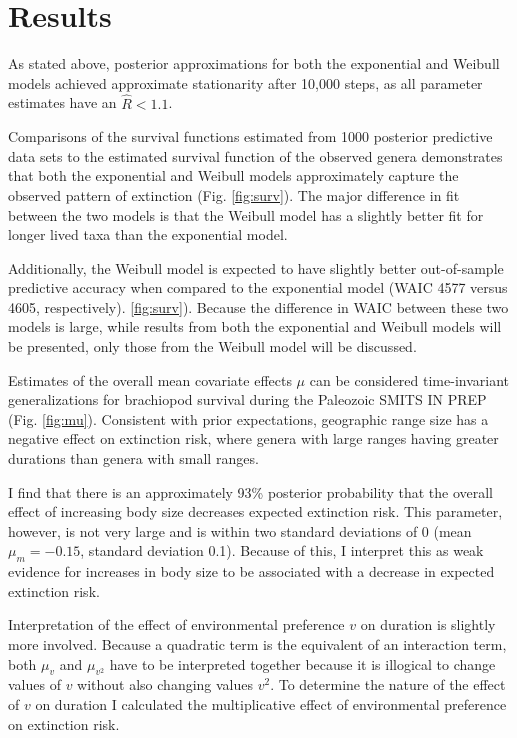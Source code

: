 \documentclass[12pt,letterpaper]{article}
\begin{document}
\section{Results}

As stated above, posterior approximations for both the exponential and Weibull models achieved approximate stationarity after 10,000 steps, as all parameter estimates have an \(\hat{R} < 1.1\).%

Comparisons of the survival functions estimated from 1000 posterior predictive data sets to the estimated survival function of the observed genera demonstrates that both the exponential and Weibull models approximately capture the observed pattern of extinction (Fig. \ref{fig:surv}). The major difference in fit between the two models is that the Weibull model has a slightly better fit for longer lived taxa than the exponential model.


Additionally, the Weibull model is expected to have slightly better out-of-sample predictive accuracy when compared to the exponential model (WAIC 4577 versus 4605, respectively). \ref{fig:surv}). Because the difference in WAIC between these two models is large, while results from both the exponential and Weibull models will be presented, only those from the Weibull model will be discussed.

Estimates of the overall mean covariate effects \(\mu\) can be considered time-invariant generalizations for brachiopod survival during the Paleozoic \uppercase{Smits in prep} (Fig. \ref{fig:mu}). Consistent with prior expectations, geographic range size has a negative effect on extinction risk, where genera with large ranges having greater durations than genera with small ranges. 

I find that there is an approximately 93\% posterior probability that the overall effect of increasing body size decreases expected extinction risk. This parameter, however, is not very large and is within two standard deviations of 0 (mean \(\mu_{m} = -0.15\), standard deviation 0.1). Because of this, I interpret this as weak evidence for increases in body size to be associated with a decrease in expected extinction risk.

Interpretation of the effect of environmental preference \(v\) on duration is slightly more involved. Because a quadratic term is the equivalent of an interaction term, both \(\mu_{v}\) and \(\mu_{v^{2}}\) have to be interpreted together because it is illogical to change values of \(v\) without also changing values \(v^{2}\). To determine the nature of the effect of \(v\) on duration I calculated the multiplicative effect of environmental preference on extinction risk.
\end{document}
